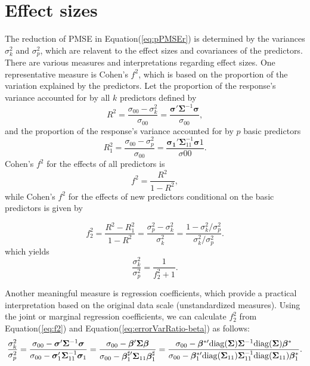\section{Effect sizes}

The reduction of PMSE in Equation(\ref{eq:pPMSEr}) is determined by the variances $\sigma_k^2$ and $\sigma_p^2$, which are relavent to the effect sizes and covariances of the predictors. There are various measures and interpretations regarding effect sizes. One representative measure is Cohen's $f^2$, which is based on the proportion of the variation explained by the predictors. 
Let the proportion of the response's variance accounted for by all $k$ predictors defined by
$$R^2 = \frac{\sigma_{00}-\sigma^2_k}{\sigma_{00}} = \frac{\boldsymbol{\sigma}' \boldsymbol{\Sigma}^{-1} \boldsymbol{\sigma}}{\sigma_{00}},$$ and the proportion of the response's variance accounted for by $p$ basic predictors 
$$R_1^2 = \frac{\sigma_{00}-\sigma^2_p}{\sigma_{00}} = \frac{\boldsymbol{\sigma_1}' \boldsymbol{\Sigma}_{11}^{-1} \boldsymbol{\sigma}1}{\sigma{00}}.$$ 
Cohen's $f^2$ for the effects of all predictors is 
$$f^2 = \frac{R^2}{1-R^2},$$ 
while Cohen's $f^2$ for the effects of new predictors conditional on the basic predictors is given by

\begin{equation}
\label{eq:f2}
f_2^2 = \frac{R^2 - R_1^2}{1- R^2} = \frac{\sigma_p^2 - \sigma_k^2}{\sigma_k^2} = \frac{1 - \sigma_k^2/\sigma_p^2}{\sigma_k^2/\sigma_p^2}.
\end{equation}
which yields
\begin{equation}
\label{eq:errorVarRatio-f2}
\frac{\sigma_k^2}{\sigma_p^2}=\frac{1}{f_2^2 + 1}.
\end{equation}

Another meaningful measure is regression coefficients, which provide a practical interpretation based on the original data scale (unstandardized measures). Using the joint or marginal regression coefficients, we can calculate $f_2^2$ from  Equation(\ref{eq:f2}) and Equation(\ref{eq:errorVarRatio-beta}) as follows:
\begin{equation}
\label{eq:errorVarRatio-beta}
\frac{\sigma_k^2}{\sigma_p^2}
=\frac{\sigma_{00} - \boldsymbol{\sigma}' \boldsymbol{\Sigma}^{-1} \boldsymbol{\sigma}}{\sigma_{00} - \boldsymbol{\sigma}_1' \boldsymbol{\Sigma}_{11}^{-1} \boldsymbol{\sigma}_1}
=\frac{\sigma_{00} - \boldsymbol{\beta}' \boldsymbol{\Sigma} \boldsymbol{\beta}}{\sigma_{00} - \boldsymbol{\beta}_1^{\sharp\prime} \boldsymbol{\Sigma}_{11} \boldsymbol{\beta}_1^\sharp}
=\frac{
\sigma_{00} - \boldsymbol{\beta}^{*\prime} {\rm diag}(\boldsymbol{\Sigma}) \boldsymbol{\Sigma}^{-1} {\rm diag}(\boldsymbol{\Sigma})\boldsymbol{\beta}^*
}{
\sigma_{00} - \boldsymbol{\beta}_1^{*\prime} {\rm diag}(\boldsymbol{\Sigma}_{11})\boldsymbol{\Sigma}_{11}^{-1} {\rm diag}(\boldsymbol{\Sigma}_{11})\boldsymbol{\beta}_1^*
}.
\end{equation}
